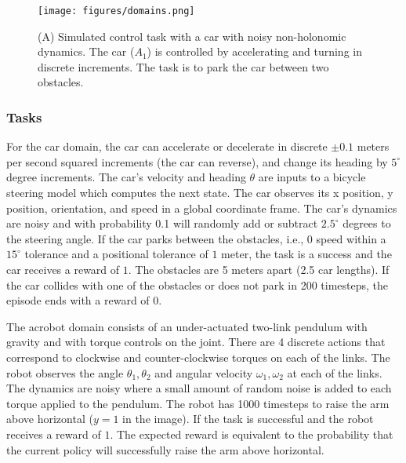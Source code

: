 \begin{figure}[t]
\centering
 \texttt{[image: figures/domains.png]}
 \caption{(A) Simulated control task with a car with noisy non-holonomic dynamics. The car ($A_1$) is controlled by accelerating and turning in discrete increments. The task is to park the car between two obstacles. \label{domains}}
\end{figure}

\subsubsection{Tasks}
For the car domain, the car can accelerate or decelerate in discrete $\pm 0.1$ meters per second squared increments (the car can reverse), and change its heading by $5^\circ$ degree increments.
The car's velocity and heading $\theta$ are inputs to a bicycle steering model which computes the next state.
The car observes its x position, y position, orientation, and speed in a global coordinate frame.
The car's dynamics are noisy and with probability 0.1 will randomly add or subtract $2.5^\circ$ degrees to the steering angle.
If the car parks between the obstacles, i.e., 0 speed within a $15^\circ$ tolerance and a positional tolerance of $1$ meter, the task is a success and the car receives a reward of $1$. 
The obstacles are 5 meters apart (2.5 car lengths).
If the car collides with one of the obstacles or does not park in 200 timesteps, the episode ends with a reward of $0$.

The acrobot domain consists of an under-actuated two-link pendulum with gravity and with torque controls on the joint. 
There are 4 discrete actions that correspond to clockwise and counter-clockwise torques on each of the links. 
The robot observes the angle $\theta_1, \theta_2$ and angular velocity $\omega_1, \omega_2$ at each of the links.
The dynamics are noisy where a small amount of random noise is added to each torque applied to the pendulum. 
The robot has 1000 timesteps to raise the arm above horizontal ($y=1$ in the image). If the task is successful and the robot receives a reward of $1$. 
The expected reward is equivalent to the probability that the current policy will successfully raise the arm above horizontal.

